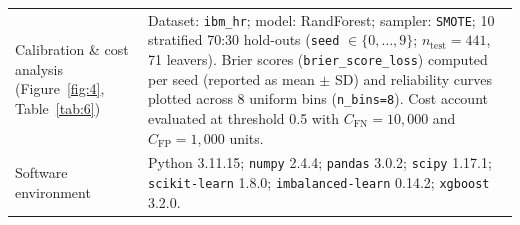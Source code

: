 \documentclass[12pt,a4paper]{article}
\begin{document}
\begin{longtable}{@{}>{\raggedright\arraybackslash}p{}>{\raggedright\arraybackslash}p{}@{}}
Calibration \& cost analysis (Figure~\ref{fig:4}, Table~\ref{tab:6}) & Dataset: \texttt{ibm\_hr}; model: RandForest; sampler: \texttt{SMOTE}; 10 stratified 70:30 hold-outs (\texttt{seed} $\in \{0,\dots,9\}$; $n_{\text{test}}=441$, 71 leavers). Brier scores (\texttt{brier\_score\_loss}) computed per seed (reported as mean $\pm$ SD) and reliability curves plotted across 8 uniform bins (\texttt{n\_bins=8}). Cost account evaluated at threshold 0.5 with $C_{\text{FN}}=10{,}000$ and $C_{\text{FP}}=1{,}000$ units. \\
Software environment & Python 3.11.15; \texttt{numpy} 2.4.4; \texttt{pandas} 3.0.2; \texttt{scipy} 1.17.1; \texttt{scikit-learn} 1.8.0; \texttt{imbalanced-learn} 0.14.2; \texttt{xgboost} 3.2.0. \\
\end{longtable}
\endgroup

\clearpage
\titleformat{\section}{\normalfont\normalsize\bfseries}{}{0pt}{}
\renewcommand{\thetable}{\arabic{table}}
\renewcommand{\theHtable}{main.\arabic{table}}
\setcounter{table}{0}
\end{document}
